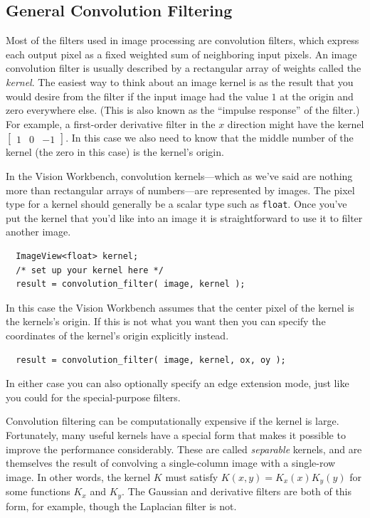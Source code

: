 \subsection{General Convolution Filtering}

Most of the filters used in image processing are convolution filters,
which express each output pixel as a fixed weighted sum of neighboring
input pixels.  An image convolution filter is usually described by a
rectangular array of weights called the {\it kernel}.  The easiest way
to think about an image kernel is as the result that you would desire 
from the filter if the input image had the value $1$ at the origin and
zero everywhere else.  (This is also known as the ``impulse response''
of the filter.)  For example, a first-order derivative filter in the
$x$ direction might have the kernel
$[\begin{array}{ccc} 1 & 0 & -1 \end{array}]$.
In this case we also need to know that the middle number of the kernel 
(the zero in this case) is the kernel's origin.

In the Vision Workbench, convolution kernels---which as we've said are 
nothing more than rectangular arrays of numbers---are represented by 
images.  The pixel type for a kernel should generally be a scalar type 
such as \verb#float#.  Once you've put the kernel that you'd like into 
an image it is straightforward to use it to filter another image.
\begin{verbatim}
  ImageView<float> kernel;
  /* set up your kernel here */
  result = convolution_filter( image, kernel );
\end{verbatim}
In this case the Vision Workbench assumes that the center pixel of the
kernel is the kernels's origin.  If this is not what you want then you
can specify the coordinates of the kernel's origin explicitly instead.
\begin{verbatim}
  result = convolution_filter( image, kernel, ox, oy );
\end{verbatim}
In either case you can also optionally specify an edge extension mode, 
just like you could for the special-purpose filters.

Convolution filtering can be computationally expensive if the kernel
is large.  Fortunately, many useful kernels have a special form that
makes it possible to improve the performance considerably.  These are
called {\it separable} kernels, and are themselves the result of
convolving a single-column image with a single-row image.  In other
words, the kernel $K$ must satisfy $K(x,y)=K_x(x)K_y(y)$ for some
functions $K_x$ and $K_y$.  The Gaussian and derivative filters
are both of this form, for example, though the Laplacian filter is
not.

